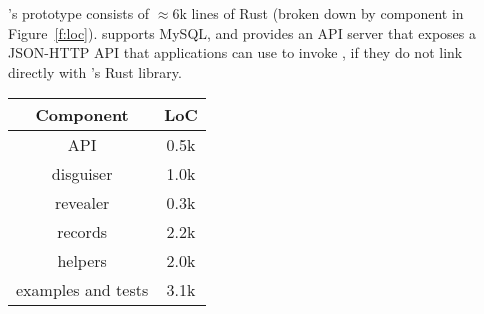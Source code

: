 %
\sys's prototype consists of $\approx6$k lines of Rust (broken down by component in
Figure~\ref{f:loc}). 
%
\sys supports MySQL, and provides an API server that exposes a JSON-HTTP API that applications
can use to invoke \sys, if they do not link directly with \sys's Rust library.
%

\begin{figure*}[t]
\centering
\begin{tabular}{cc}
    \textbf{Component} & \textbf{LoC} \\
\hline
    API & 0.5k\\
    disguiser & 1.0k\\
    revealer & 0.3k \\
    records & 2.2k \\
    helpers & 2.0k \\
    examples and tests & 3.1k\\

\end{tabular}
    \caption[\sys's code components and LoC.]{Code components of \sys and the respective LoC to implement. Much
    of the logic for reveal is embedded in the records implementation (\eg a
    diff record struct implements \texttt{reveal}); the revealer handles the
    order at which diff records are revealing and modifications of the speaks-for
    chain.} \label{f:loc}
\end{figure*}


